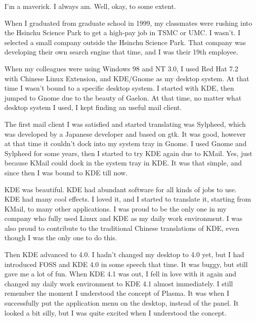 


\noindent{}I'm a maverick. I always am. Well, okay, to some extent.

When I graduated from graduate school in 1999, my classmates were
rushing into the Hsinchu Science Park to get a high-pay job in TSMC
or UMC. I wasn't. I selected a small company outside the Hsinchu Science
Park. That company was developing their own search engine that time,
and I was their 19th employee.

When my colleagues were using Windows 98 and NT 3.0, I used Red Hat
7.2 with Chinese Linux Extension, and KDE/Gnome as my desktop system.
At that time I wasn't bound to a specific desktop system. I started
with KDE, then jumped to Gnome due to the beauty of Gaelon. At that
time, no matter what desktop system I used, I kept finding an useful
mail client.

The first mail client I was satisfied and started translating was
Sylpheed, which was developed by a Japanese developer and based on
gtk. It was good, however at that time it couldn't dock into my system
tray in Gnome. I used Gnome and Sylpheed for some years, then I started
to try KDE again due to KMail. Yes, just because KMail could dock
in the system tray in KDE. It was that simple, and since then I was
bound to KDE till now.

KDE was beautiful. KDE had abundant software for all kinds of jobs
to use. KDE had many cool effects. I loved it, and I started to translate
it, starting from KMail, to many other applications. I was proud to
be the only one in my company who fully used Linux and KDE as my daily
work environment. I was also proud to contribute to the traditional
Chinese translations of KDE, even though I was the only one to do
this.

Then KDE advanced to 4.0. I hadn't changed my desktop to 4.0 yet,
but I had introduced FOSS and KDE 4.0 in some speech that time. It
was buggy, but still gave me a lot of fun. When KDE 4.1 was out, I
fell in love with it again and changed my daily work environment to
KDE 4.1 almost immediately. I still remember the moment I understood
the concept of Plasma. It was when I successfully put the application
menu on the desktop, instead of the panel. It looked a bit silly,
but I was quite excited when I understood the concept.

